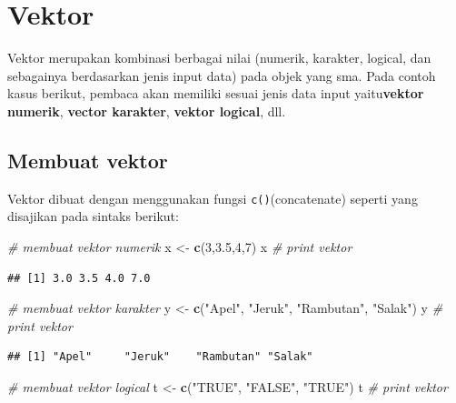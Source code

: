 \documentclass[]{book}
\newenvironment{Shaded}{\begin{snugshade}}{\end{snugshade}}
\newcommand{\CommentTok}[1]{\textcolor[rgb]{0.56,0.35,0.01}{\textit{#1}}}
\newcommand{\DecValTok}[1]{\textcolor[rgb]{0.00,0.00,0.81}{#1}}
\newcommand{\FloatTok}[1]{\textcolor[rgb]{0.00,0.00,0.81}{#1}}
\newcommand{\KeywordTok}[1]{\textcolor[rgb]{0.13,0.29,0.53}{\textbf{#1}}}
\newcommand{\NormalTok}[1]{#1}
\newcommand{\StringTok}[1]{\textcolor[rgb]{0.31,0.60,0.02}{#1}}
\theoremstyle{definition}
\theoremstyle{definition}
\theoremstyle{definition}
\theoremstyle{remark}
\begin{document}
\hypertarget{vector}{%
\section{Vektor}\label{vector}}

Vektor merupakan kombinasi berbagai nilai (numerik, karakter, logical, dan sebagainya berdasarkan jenis input data) pada objek yang sma. Pada contoh kasus berikut, pembaca akan memiliki sesuai jenis data input yaitu\textbf{vektor numerik}, \textbf{vector karakter}, \textbf{vektor logical}, dll.

\hypertarget{createvector}{%
\subsection{Membuat vektor}\label{createvector}}

Vektor dibuat dengan menggunakan fungsi \texttt{c()}(concatenate) seperti yang disajikan pada sintaks berikut:

\begin{Shaded}
\begin{Highlighting}[]
\CommentTok{# membuat vektor numerik}
\NormalTok{x <-}\StringTok{ }\KeywordTok{c}\NormalTok{(}\DecValTok{3}\NormalTok{,}\FloatTok{3.5}\NormalTok{,}\DecValTok{4}\NormalTok{,}\DecValTok{7}\NormalTok{)}
\NormalTok{x }\CommentTok{# print vektor}
\end{Highlighting}
\end{Shaded}

\begin{verbatim}
## [1] 3.0 3.5 4.0 7.0
\end{verbatim}

\begin{Shaded}
\begin{Highlighting}[]
\CommentTok{# membuat vektor karakter}
\NormalTok{y <-}\StringTok{ }\KeywordTok{c}\NormalTok{(}\StringTok{"Apel"}\NormalTok{, }\StringTok{"Jeruk"}\NormalTok{, }\StringTok{"Rambutan"}\NormalTok{, }\StringTok{"Salak"}\NormalTok{)}
\NormalTok{y }\CommentTok{# print vektor}
\end{Highlighting}
\end{Shaded}

\begin{verbatim}
## [1] "Apel"     "Jeruk"    "Rambutan" "Salak"
\end{verbatim}

\begin{Shaded}
\begin{Highlighting}[]
\CommentTok{# membuat vektor logical}
\NormalTok{t <-}\StringTok{ }\KeywordTok{c}\NormalTok{(}\StringTok{"TRUE"}\NormalTok{, }\StringTok{"FALSE"}\NormalTok{, }\StringTok{"TRUE"}\NormalTok{)}
\NormalTok{t }\CommentTok{# print vektor}
\end{Highlighting}
\end{Shaded}
\end{document}
